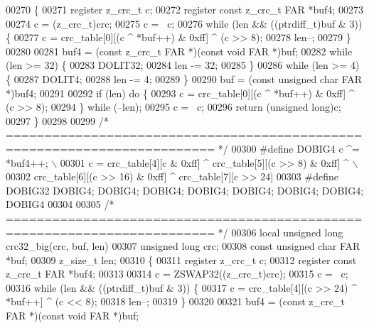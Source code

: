 \begin{DoxyCode}
{00270 \{
00271     \textcolor{keyword}{register} z\_crc\_t c;
00272     \textcolor{keyword}{register} \textcolor{keyword}{const} z\_crc\_t FAR *buf4;
00273 
00274     c = (z\_crc\_t)crc;
00275     c = ~c;
00276     \textcolor{keywordflow}{while} (len && ((ptrdiff\_t)buf & 3)) \{
00277         c = crc\_table[0][(c ^ *buf++) & 0xff] ^ (c >> 8);
00278         len--;
00279     \}
00280 
00281     buf4 = (\textcolor{keyword}{const} z\_crc\_t FAR *)(\textcolor{keyword}{const} \textcolor{keywordtype}{void} FAR *)buf;
00282     \textcolor{keywordflow}{while} (len >= 32) \{
00283         DOLIT32;
00284         len -= 32;
00285     \}
00286     \textcolor{keywordflow}{while} (len >= 4) \{
00287         DOLIT4;
00288         len -= 4;
00289     \}
00290     buf = (\textcolor{keyword}{const} \textcolor{keywordtype}{unsigned} \textcolor{keywordtype}{char} FAR *)buf4;
00291 
00292     \textcolor{keywordflow}{if} (len) \textcolor{keywordflow}{do} \{
00293         c = crc\_table[0][(c ^ *buf++) & 0xff] ^ (c >> 8);
00294     \} \textcolor{keywordflow}{while} (--len);
00295     c = ~c;
00296     \textcolor{keywordflow}{return} (\textcolor{keywordtype}{unsigned} \textcolor{keywordtype}{long})c;
00297 \}
00298 
00299 \textcolor{comment}{/* ========================================================================= */}
00300 \textcolor{preprocessor}{#define DOBIG4 c ^= *buf4++; \(\backslash\)}
00301 \textcolor{preprocessor}{        c = crc\_table[4][c & 0xff] ^ crc\_table[5][(c >> 8) & 0xff] ^ \(\backslash\)}
00302 \textcolor{preprocessor}{            crc\_table[6][(c >> 16) & 0xff] ^ crc\_table[7][c >> 24]}
00303 \textcolor{preprocessor}{#define DOBIG32 DOBIG4; DOBIG4; DOBIG4; DOBIG4; DOBIG4; DOBIG4; DOBIG4; DOBIG4}
00304 
00305 \textcolor{comment}{/* ========================================================================= */}
00306 local \textcolor{keywordtype}{unsigned} \textcolor{keywordtype}{long} crc32\_big(crc, buf, len)
00307     \textcolor{keywordtype}{unsigned} \textcolor{keywordtype}{long} crc;
00308     \textcolor{keyword}{const} \textcolor{keywordtype}{unsigned} \textcolor{keywordtype}{char} FAR *buf;
00309     z\_size\_t len;
00310 \{
00311     \textcolor{keyword}{register} z\_crc\_t c;
00312     \textcolor{keyword}{register} \textcolor{keyword}{const} z\_crc\_t FAR *buf4;
00313 
00314     c = ZSWAP32((z\_crc\_t)crc);
00315     c = ~c;
00316     \textcolor{keywordflow}{while} (len && ((ptrdiff\_t)buf & 3)) \{
00317         c = crc\_table[4][(c >> 24) ^ *buf++] ^ (c << 8);
00318         len--;
00319     \}
00320 
00321     buf4 = (\textcolor{keyword}{const} z\_crc\_t FAR *)(\textcolor{keyword}{const} \textcolor{keywordtype}{void} FAR *)buf;
}
\end{DoxyCode}
